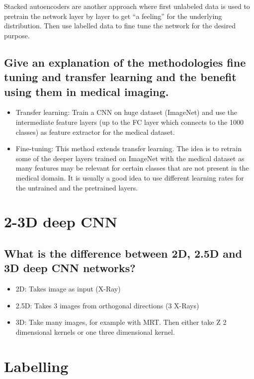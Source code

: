 Stacked autoencoders are another approach where first unlabeled data is used to pretrain the network layer by layer to get ``a feeling'' for the underlying distribution. Then use labelled data to fine tune the network for the desired purpose.
\subsection{Give an explanation of the methodologies fine tuning and transfer learning and the benefit using them in medical imaging. }
\begin{itemize}
\item Transfer learning: Train a CNN on huge dataset (ImageNet) and use the intermediate feature layers (up to the FC layer which connects to the 1000 classes) as feature extractor for the medical dataset. 
\item Fine-tuning: This method extends transfer learning. The idea is to retrain some of the deeper layers trained on ImageNet with the medical dataset as many features may be relevant for certain classes that are not present in the medical domain. It is usually a good idea to use different learning rates for the untrained and the pretrained layers.
\end{itemize}

%
\section{2-3D deep CNN}
\subsection{What is the difference between 2D, 2.5D and 3D deep CNN networks?}
\begin{itemize}
\item 2D: Takes image as input (X-Ray)
\item 2.5D: Takes 3 images from orthogonal directions (3 X-Rays)
\item 3D: Take many images, for example with MRT. Then either take Z 2 dimensional kernels or one three dimensional kernel.
\end{itemize}

\section{Labelling}
